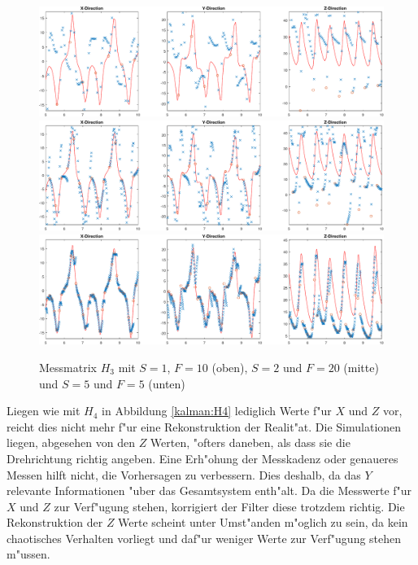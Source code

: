 \begin{refsection}
\begin{figure}
\centering
\includegraphics[width=\hsize]{kalman/figures/H3R10S1.pdf}
\includegraphics[width=\hsize]{kalman/figures/H3R20S2.pdf}
\includegraphics[width=\hsize]{kalman/figures/H3R05S5.pdf}
\caption{Messmatrix $H_{3}$ mit $S=1$, $F=10$ (oben), $S=2$ und $F=20$ (mitte) und $S=5$ und $F=5$ (unten)}
\label{kalman:H3}
\end{figure}

Liegen wie mit $H_{4}$ in Abbildung \ref{kalman:H4} lediglich Werte f"ur $X$ und $Z$ vor, reicht dies nicht mehr f"ur eine Rekonstruktion der Realit"at. Die Simulationen liegen, abgesehen von den $Z$ Werten, "ofters daneben, als dass sie die Drehrichtung richtig angeben. Eine Erh"ohung der Messkadenz oder genaueres Messen hilft nicht, die Vorhersagen zu verbessern. Dies deshalb, da das $Y$ relevante Informationen "uber das Gesamtsystem enth"alt.
Da die Messwerte f"ur $X$ und $Z$ zur Verf"ugung stehen, korrigiert der Filter diese trotzdem richtig.
Die Rekonstruktion der $Z$ Werte scheint unter Umst"anden m"oglich zu sein, da kein chaotisches Verhalten vorliegt und daf"ur weniger Werte zur Verf"ugung stehen m"ussen.


\end{refsection}
